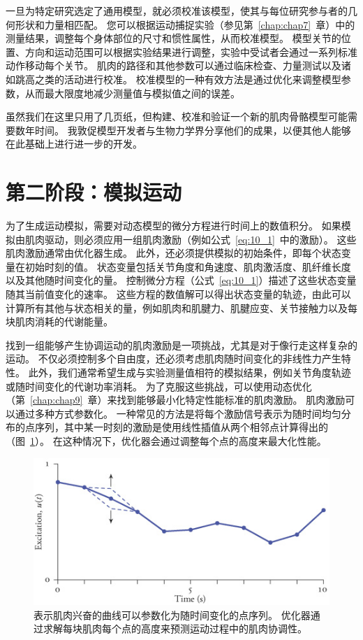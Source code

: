 一旦为特定研究选定了通用模型，就必须校准该模型，使其与每位研究参与者的几何形状和力量相匹配。
您可以根据运动捕捉实验（参见第~\ref{chap:chap7}~章）中的测量结果，调整每个身体部位的尺寸和惯性属性，从而校准模型。
模型关节的位置、方向和运动范围可以根据实验结果进行调整，实验中受试者会通过一系列标准动作移动每个关节。
肌肉的路径和其他参数可以通过临床检查、力量测试以及诸如跳高之类的活动进行校准。
校准模型的一种有效方法是通过优化来调整模型参数，从而最大限度地减少测量值与模拟值之间的误差。


虽然我们在这里只用了几页纸，但构建、校准和验证一个新的肌肉骨骼模型可能需要数年时间。
我敦促模型开发者与生物力学界分享他们的成果，以便其他人能够在此基础上进行进一步的开发。


\section{第二阶段：模拟运动}

为了生成运动模拟，需要对动态模型的微分方程进行时间上的数值积分。
如果模拟由肌肉驱动，则必须应用一组肌肉激励（例如公式~\ref{eq:10_1}~中的激励）。
这些肌肉激励通常由优化器生成。
此外，还必须提供模拟的初始条件，即每个状态变量在初始时刻的值。
状态变量包括关节角度和角速度、肌肉激活度、肌纤维长度以及其他随时间变化的量。
控制微分方程（公式~\ref{eq:10_1}）描述了这些状态变量随其当前值变化的速率。
这些方程的数值解可以得出状态变量的轨迹，由此可以计算所有其他与状态相关的量，例如肌肉和肌腱力、肌腱应变、关节接触力以及每块肌肉消耗的代谢能量。


找到一组能够产生协调运动的肌肉激励是一项挑战，尤其是对于像行走这样复杂的运动。
不仅必须控制多个自由度，还必须考虑肌肉随时间变化的非线性力产生特性。
此外，我们通常希望生成与实验测量值相符的模拟结果，例如关节角度轨迹或随时间变化的代谢功率消耗。
为了克服这些挑战，可以使用动态优化（第~\ref{chap:chap9}~章）来找到能够最小化特定性能标准的肌肉激励。
肌肉激励可以通过多种方式参数化。
一种常见的方法是将每个激励信号表示为随时间均匀分布的点序列，其中某一时刻的激励是使用线性插值从两个相邻点计算得出的（图~\ref{fig:10_7}）。
在这种情况下，优化器会通过调整每个点的高度来最大化性能。


\begin{figure}[!htb]
	\centering
	\includegraphics[width=0.8\linewidth]{chap10/10_7}
	\caption{表示肌肉兴奋的曲线可以参数化为随时间变化的点序列。
		优化器通过求解每块肌肉每个点的高度来预测运动过程中的肌肉协调性。 \label{fig:10_7}}
\end{figure}

